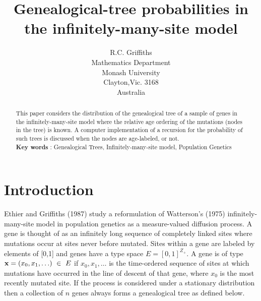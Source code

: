 \nofiles                           %

\oddsidemargin=0in  \evensidemargin=0in  \textwidth=6.3in
\topmargin=-1in                         \textheight=9.5in



\title{Genealogical-tree probabilities in the infinitely-many-site model}

\author{R.C. Griffiths\\
Mathematics Department \\
Monash University\\
Clayton,Vic. 3168\\
Australia\\}

\maketitle
\begin{abstract}
    This paper considers the distribution of the genealogical tree of a 
sample of genes in the infinitely-many-site model where the relative
age ordering of the mutations (nodes in the tree) is known.
A computer implementation of a recursion for the probability of such trees
is discussed when the nodes are age-labeled, or not. \\
\vspace{0.3cm}
{\bf Key words} : Genealogical Trees, Infinitely-many-site model, Population
Genetics
\end{abstract}
\section{Introduction}    

    Ethier and Griffiths (1987) study a reformulation of Watterson's (1975)
infinitely-many-site model in population genetics as a measure-valued
diffusion process. A gene is thought of as an infinitely long sequence
of completely linked sites where mutations occur at sites never
before mutated. Sites within a gene are labeled by elements
of [0,1] and genes have a type space $E = [0,1]^{Z_+}$.
A gene is of type ${\bf  x} = (x_0,x_1,\ldots) ~\in~ E$ if $x_0,x_1,\ldots$
is the time-ordered sequence of sites 
at which mutations have occurred in the line of 
descent of that gene, where $x_0$ is the most recently mutated site.
If the process is considered under a stationary 
distribution then a collection of $n$ genes always forms a genealogical 
tree as defined below. 

